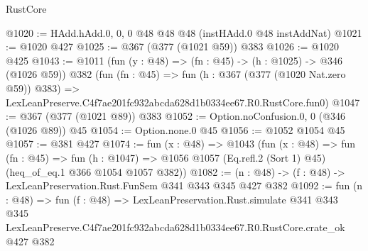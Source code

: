 \begin{lexlean}{RustCore}
\begin{coremodule}
@1020 := HAdd.hAdd.{0, 0, 0} @48 @48 @48 (instHAdd.{0} @48 instAddNat)
@1021 := @1020 @427
@1025 := @367 (@377 (@1021 @59)) @383
@1026 := @1020 @425
@1043 := @1011
    (fun (y : @48) => (fn : @45) -> (h : @1025) -> @346 (@1026 @59))
    @382
    (fun (fn : @45) =>
    fun (h : @367 (@377 (@1020 Nat.zero @59)) @383) =>
    LexLeanPreserve.C4f7ae201fc932abcda628d1b0334ee67.R0.RustCore.fun0)
@1047 := @367 (@377 (@1021 @89)) @383
@1052 := Option.noConfusion.{0, 0} (@346 (@1026 @89)) @45
@1054 := Option.none.{0} @45
@1056 := @1052 @1054 @45
@1057 := @381 @427
@1074 := fun (x : @48) =>
  @1043
    (fun (x : @48) =>
    fun (fn : @45) =>
    fun (h : @1047) => @1056 @1057 (Eq.refl.{2} (Sort 1) @45) (heq_of_eq.{1} @366 @1054 @1057 @382))
@1082 := (n : @48) -> (f : @48) -> LexLeanPreservation.Rust.FunSem @341 @343 @345 @427 @382
@1092 := fun (n : @48) =>
  fun (f : @48) =>
  LexLeanPreservation.Rust.simulate
    @341
    @343
    @345
    LexLeanPreserve.C4f7ae201fc932abcda628d1b0334ee67.R0.RustCore.crate_ok
    @427
    @382
\end{coremodule}
\end{lexlean}
